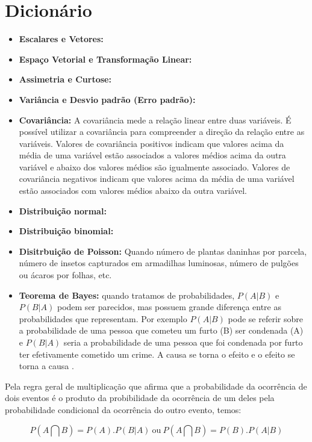 \documentclass[
]{book}
\begin{document}
\hypertarget{dicio}{%
\section{Dicionário}\label{dicio}}

\begin{itemize}
\item
  \textbf{Escalares e Vetores:}
\item
  \textbf{Espaço Vetorial e Transformação Linear:}
\item
  \textbf{Assimetria e Curtose:}
\item
  \textbf{Variância e Desvio padrão (Erro padrão):}
\item
  \textbf{Covariância:} A covariância mede a relação linear entre duas variáveis.
  É possível utilizar a covariância para compreender a direção da relação entre as variáveis. Valores de covariância positivos indicam que valores acima da média de uma variável estão associados a valores médios acima da outra variável e abaixo dos valores médios são igualmente associado. Valores de covariância negativos indicam que valores acima da média de uma variável estão associados com valores médios abaixo da outra variável.
\item
  \textbf{Distribuição normal:}
\item
  \textbf{Distribuição binomial:}
\item
  \textbf{Disitrbuição de Poisson:} \citep{banzatto1992experimentaccao} Quando número de plantas daninhas por parcela, número de insetos capturados em armadilhas luminosas, número de pulgões ou ácaros por folhas, etc.
\item
  \textbf{Teorema de Bayes:} quando tratamos de probabilidades, \(P(A|B)\) e \(P(B|A)\) podem ser parecidos, mas possuem grande diferença entre as probabilidades que representam. Por exemplo \(P(A|B)\) pode se referir sobre a probabilidade de uma pessoa que cometeu um furto (B) ser condenada (A) e \(P(B|A)\) seria a probabilidade de uma pessoa que foi condenada por furto ter efetivamente cometido um crime. A causa se torna o efeito e o efeito se torna a causa \citep{freund2009estatistica}.
\end{itemize}

Pela regra geral de multiplicação que afirma que a probabilidade da ocorrência de dois eventos é o produto da probibilidade da ocorrência de um deles pela probabilidade condicional da ocorrência do outro evento, temos:

\begin{equation} 
 P(A \bigcap B)= P(A). P(B|A) \  \mbox{ou} \ P(A \bigcap B)= P(B). P(A|B)
  \label{eq:multprob}
\end{equation}
\end{document}
